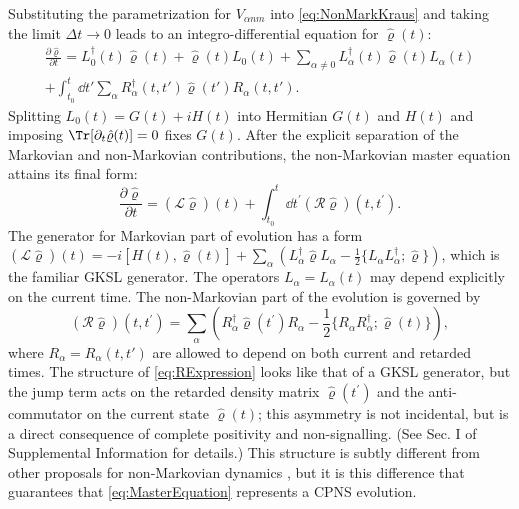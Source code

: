 \documentclass[
    11pt,
    letterpaper,
    reprint,
    notitlepage,
    superscriptaddress,
    aps,prx
]{revtex4-2}
\renewcommand{\rho}{\varrho}
\newcommand{\p}{\partial}
\begin{document}
Substituting the parametrization for $V_{\alpha nm}$ into \cref{eq:NonMarkKraus} and taking the limit $\Delta t \to 0$ leads to an integro-differential equation for $\hat\rho(t)$:
%
\begin{multline}\label{eq:EqwithL0}
	\frac{\p \hat \rho}{\p t} = 
	L_0^\dagger(t) \hat \rho(t) + \hat \rho(t) L_0(t) 
	+ \sum_{\alpha \neq 0} L_\alpha^\dagger (t) \hat \rho(t) L_\alpha(t)\\
	+ \int_{t_0}^t \dd{t'} \sum_\alpha R_\alpha^\dagger (t, t') \hat \rho(t') R_\alpha (t, t').
\end{multline}
Splitting $L_0(t) = G(t) + iH(t)$ into Hermitian $G(t)$ and $H(t)$ and imposing $\Tr[\p_t \hat \rho(t)] = 0$ fixes $G(t)$. 
%
After the explicit separation of the Markovian and non-Markovian contributions, the non-Markovian master equation attains its final form:
\begin{equation}\label{eq:MasterEquation}
	\frac{\p \hat \rho}{\p t} = (\mathcal{L}\hat \rho)(t) 
	+ \int_{t_0}^{t} \dd{t^\prime} (\mathcal{R}\hat \rho)(t, t^\prime).
\end{equation}
%
The generator for Markovian part of evolution has a form $(\mathcal{L}\hat \rho)(t) 
= - i [H(t), \hat \rho(t)] + \sum_{\alpha}\!\left( L^\dagger_\alpha \hat \rho L_\alpha - \tfrac{1}{2}\{ L_\alpha L_\alpha^\dagger; \hat \rho \}\right)$, which is the familiar GKSL generator. 
The operators $L_\alpha = L_\alpha(t)$ may depend explicitly on the current time. 
The non-Markovian part of the evolution is governed by
\begin{equation}\label{eq:RExpression}
	(\mathcal{R}\hat \rho)(t, t^\prime) = \sum_\alpha \left( R_\alpha^\dagger\hat\rho(t^\prime) R_\alpha - \frac{1}{2} \{ R_\alpha R_\alpha^\dagger; \hat \rho(t) \} \right),
\end{equation}
where $R_\alpha = R_\alpha(t, t')$ are allowed to depend on both current and retarded times.
The structure of \cref{eq:RExpression} looks like that of a GKSL generator, but the jump term
acts on the retarded density matrix $\hat \rho(t^\prime)$ and the anti-commutator 
on the current state $\hat \rho(t)$; 
this asymmetry is not incidental, but is a direct consequence of complete positivity 
and non-signalling. (See Sec. I of Supplemental Information \cite{Supplement} for details.)
This structure is subtly different from other proposals for non-Markovian 
dynamics \cite{Nakajima,Zwanzig,Shabani2005,Vacch16}, but it is this difference that guarantees 
that \cref{eq:MasterEquation} represents a CPNS evolution.
\end{document}
